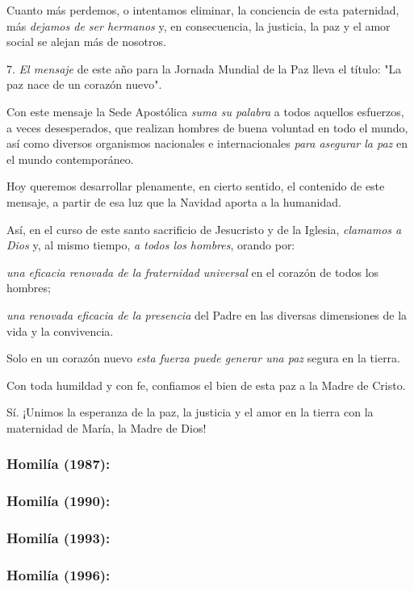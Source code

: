 \begin{body}
Cuanto más perdemos, o intentamos eliminar, la conciencia de esta
paternidad, más \emph{dejamos de ser hermanos} y, en consecuencia, la
justicia, la paz y el amor social se alejan más de nosotros.

7. \emph{El mensaje} de este año para la Jornada Mundial de la Paz lleva
el título: "La paz nace de un corazón nuevo".

Con este mensaje la Sede Apostólica \emph{suma su palabra} a todos
aquellos esfuerzos, a veces desesperados, que realizan hombres de buena
voluntad en todo el mundo, así como diversos organismos nacionales e
internacionales \emph{para asegurar la paz} en el mundo contemporáneo.

Hoy queremos desarrollar plenamente, en cierto sentido, el contenido de
este mensaje, a partir de esa luz que la Navidad aporta a la humanidad.

Así, en el curso de este santo sacrificio de Jesucristo y de la Iglesia,
\emph{clamamos a Dios} y, al mismo tiempo, \emph{a todos los hombres},
orando por:

\emph{una eficacia renovada de la fraternidad universal} en el corazón
de todos los hombres;

\emph{una renovada eficacia de la presencia} del Padre en las diversas
dimensiones de la vida y la convivencia.

Solo en un corazón nuevo \emph{esta fuerza puede generar una paz} segura
en la tierra.

Con toda humildad y con fe, confiamos el bien de esta paz a la Madre de
Cristo.

Sí. ¡Unimos la esperanza de la paz, la justicia y el amor en la tierra
con la maternidad de María, la Madre de Dios!


\subsubsection{Homilía (1987): }

\subsubsection{Homilía (1990): }

\subsubsection{Homilía (1993): }

\subsubsection{Homilía (1996): }


\end{body}
